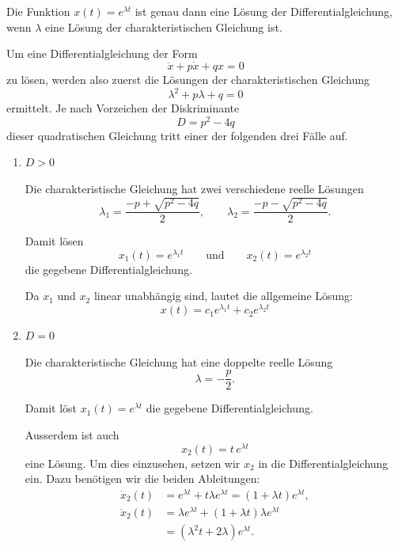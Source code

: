 \begin{satz}
    {}{}
    Die Funktion \(x(t)=e^{\lambda t}\) ist genau dann eine Lösung der
    Differentialgleichung, wenn \(\lambda\) eine Lösung der
    charakteristischen Gleichung ist.
\end{satz}

Um eine Differentialgleichung der Form
\[
    \ddot{x}+p\dot{x}+qx=0
\]
zu lösen, werden also zuerst die Lösungen der charakteristischen Gleichung
\[
    \lambda^2+p\lambda+q=0
\]
ermittelt. Je nach Vorzeichen der Diskriminante
\[
    D=p^2-4q
\]
dieser quadratischen Gleichung tritt einer der folgenden drei Fälle auf.

\begin{enumerate}
    \item[\textbf{1. Fall:}] \textbf{\(D>0\)}

          Die charakteristische Gleichung hat zwei verschiedene reelle Lösungen
          \[
              \lambda_1=\frac{-p+\sqrt{p^2-4q}}{2},
              \qquad
              \lambda_2=\frac{-p-\sqrt{p^2-4q}}{2}.
          \]

          Damit lösen
          \[
              x_1(t)=e^{\lambda_1t}
              \qquad\text{und}\qquad
              x_2(t)=e^{\lambda_2t}
          \]
          die gegebene Differentialgleichung.

          Da \(x_1\) und \(x_2\) linear unabhängig sind, lautet die
          allgemeine Lösung:
          \[
              \boxed{x(t)=c_1e^{\lambda_1t}+c_2e^{\lambda_2t}}
          \]

    \item[\textbf{2. Fall:}] \textbf{\(D=0\)}

          Die charakteristische Gleichung hat eine doppelte reelle Lösung
          \[
              \lambda=-\frac{p}{2}.
          \]

          Damit löst \(x_1(t)=e^{\lambda t}\) die gegebene
          Differentialgleichung.

          Ausserdem ist auch
          \[
              x_2(t)=t\,e^{\lambda t}
          \]
          eine Lösung. Um dies einzusehen, setzen wir \(x_2\) in die
          Differentialgleichung ein. Dazu benötigen wir die beiden Ableitungen:
          \begin{align*}
              \dot{x}_2(t)
               & =e^{\lambda t}+t\lambda e^{\lambda t}
              =(1+\lambda t)e^{\lambda t},             \\
              \ddot{x}_2(t)
               & =\lambda e^{\lambda t}
              +(1+\lambda t)\lambda e^{\lambda t}      \\
               & =(\lambda^2t+2\lambda)e^{\lambda t}.
          \end{align*}


\end{enumerate}
